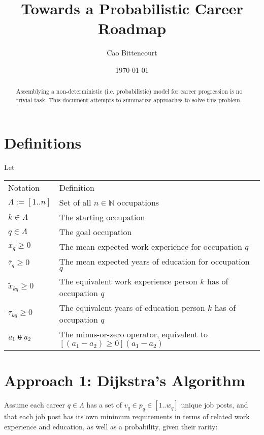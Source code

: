 \documentclass[12pt, a4paper]{article}
\title{
    Towards a Probabilistic Career Roadmap
}
\author{Cao Bittencourt}
\date{\today}
\makeatletter
\newcommand{\superimpose}[2]{{
  \ooalign{
    \hfil$\m@th#1\@firstoftwo#2$\hfil\cr
    \hfil$\m@th#1\@secondoftwo#2$\hfil\cr
  }
}}
\newcommand{\stack}[2]{\mathbin{\mathpalette\superimpose{{#1}{#2}}}}
\newcommand{\minuszero}{\stack{0}{-}}
\makeatother
\begin{document}
\maketitle

\begin{abstract}
  \noindent
  Assemblying a non-deterministic (i.e. probabilistic) model for career progression is no trivial task. This document attempts to summarize approaches to solve this problem.
\end{abstract}

\section{Definitions}
Let \newline \newline
\begin{tabular}{ll}
  Notation                  & Definition                                                                           \\
  $\Lambda := [1 .. n]$     & Set of all $n \in \mathbb{N}$ occupations                                            \\
  $k \in \Lambda$           & The starting occupation                                                              \\
  $q \in \Lambda$           & The goal occupation                                                                  \\
  $\bar{x}_q \geq 0$        & The mean expected work experience for occupation $q$                                 \\
  $\bar{\tau}_q \geq 0$     & The mean expected years of education for occupation $q$                              \\
  $\ddot{x}_{kq} \geq 0$    & The equivalent work experience person $k$ has of occupation $q$                      \\
  $\ddot{\tau}_{kq} \geq 0$ & The equivalent years of education person $k$ has of occupation $q$                   \\
  $a_{1} \minuszero a_{2}$  & The minus-or-zero operator, equivalent to $[(a_{1} - a_{2}) \geq 0] (a_{1} - a_{2})$ \\
\end{tabular}

\section{Approach 1: Dijkstra's Algorithm}
Assume each career $q \in \Lambda$ has a set of $v_q \in p_q \in [1 .. w_q]$
unique job posts, and that each job post has its own minimum requirements in
terms of related work experience and education, as well as a probability, given
their rarity:
\end{document}
